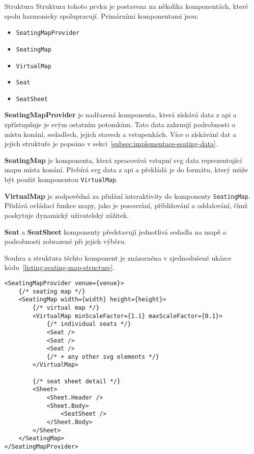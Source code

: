 \begin{subsection}{Struktura}
    \label{subsec:implementace-seating-struktura}
    Struktura tohoto prvku je postavena na několika komponentách, které spolu harmonicky spolupracují.
    Primárními komponentami jsou:

    \begin{itemize}
        \item \texttt{SeatingMapProvider}
        \item \texttt{SeatingMap}
        \item \texttt{VirtualMap}
        \item \texttt{Seat}
        \item \texttt{SeatSheet}
    \end{itemize}

    \textbf{SeatingMapProvider} je nadřazená komponenta, která získává data z \ac{api} a zpřístupňuje je svým ostatním potomkům.
    Tato data zahrnují podrobnosti o místu konání, sedadlech, jejich stavech a vstupenkách.
    Více o získávání dat a jejich struktuře je popsáno v sekci~\ref{subsec:implementace-seating-data}.

    \textbf{SeatingMap} je komponenta, která zpracovává vstupní \ac{svg} data reprezentující mapu místa konání.
    Přebírá \ac{svg} data z \ac{api} a překládá je do formátu, který může být použit komponentou \texttt{VirtualMap}.

    \textbf{VirtualMap} je zodpovědná za přidání interaktivity do komponenty \texttt{SeatingMap}.
    Přidává ovládací funkce mapy, jako je posouvání, přibližování a oddalování, čímž poskytuje dynamický uživatelský zážitek.

    \textbf{Seat} a \textbf{SeatSheet} komponenty představují jednotlivá sedadla na mapě a podrobnosti zobrazené při jejich výběru.

    Souhra a struktura těchto komponent je znázorněna v zjednodušené ukázce kódu~\ref{listing:seating-map-structure}.

    \begin{listing}[H]
        \begin{verbatim}
<SeatingMapProvider venue={venue}>
	{/* seating map */}
	<SeatingMap width={width} height={height}>
		{/* virtual map */}
		<VirtualMap minScaleFactor={1.1} maxScaleFactor={0.1}>
			{/* individual seats */}
			<Seat />
			<Seat />
			<Seat />
			{/* + any other svg elements */}
		</VirtualMap>

		{/* seat sheet detail */}
		<Sheet>
			<Sheet.Header />
			<Sheet.Body>
				<SeatSheet />
			</Sheet.Body>
		</Sheet>
	</SeatingMap>
</SeatingMapProvider>
        \end{verbatim}
        \caption{Struktura komponent mapy sedadel}
        \label{listing:seating-map-structure}
    \end{listing}
\end{subsection}

